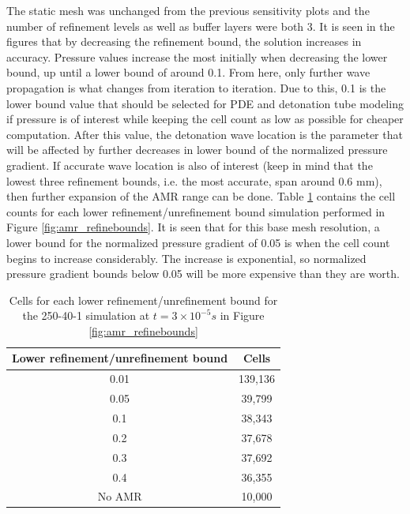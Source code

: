 \noindent The static mesh was unchanged from the previous sensitivity plots and the number of refinement levels as well as buffer layers were both 3. It is seen in the figures that by decreasing the refinement bound, the solution increases in accuracy. Pressure values increase the most initially when decreasing the lower bound, up until a lower bound of around 0.1. From here, only further wave propagation is what changes from iteration to iteration. Due to this, 0.1 is the lower bound value that should be selected for PDE and detonation tube modeling if pressure is of interest while keeping the cell count as low as possible for cheaper computation. After this value, the detonation wave location is the parameter that will be affected by further decreases in lower bound of the normalized pressure gradient. If accurate wave location is also of interest (keep in mind that the lowest three refinement bounds, i.e. the most accurate, span around 0.6 mm), then further expansion of the AMR range can be done. Table \ref{tab:amr_refinebounds} contains the cell counts for each lower refinement/unrefinement bound simulation performed in Figure \ref{fig:amr_refinebounds}. It is seen that for this base mesh resolution, a lower bound for the normalized pressure gradient of 0.05 is when the cell count begins to increase considerably. The increase is exponential, so normalized pressure gradient bounds below 0.05 will be more expensive than they are worth. 

\begin{table}
\centering
\caption{Cells for each lower refinement/unrefinement bound for the 250-40-1 simulation at \(t = 3\times 10^{ - 5} s\) in Figure \ref{fig:amr_refinebounds}}
\label{tab:amr_refinebounds}
\begin{tabular}{cc}
Lower refinement/unrefinement bound & Cells \\ \hline
0.01 & 139,136 \\
0.05 & 39,799 \\
0.1 & 38,343 \\ 
0.2 & 37,678 \\
0.3 & 37,692 \\ 
0.4 & 36,355 \\
No AMR & 10,000 \\
\end{tabular}
\end{table}

